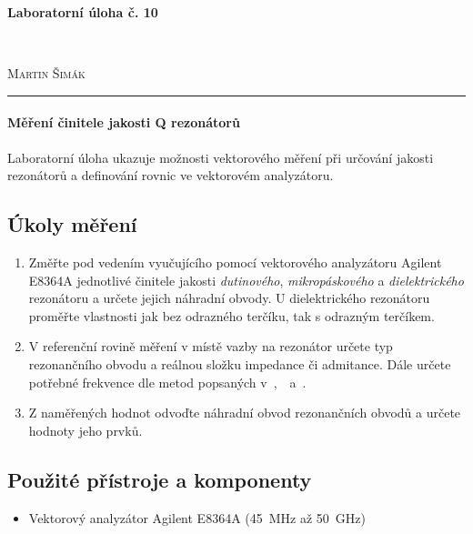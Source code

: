 \documentclass[11pt,a4paper]{article}
\begin{document}

\begin{center}
    {\LARGE\textbf{Laboratorní úloha č. 10}}\\[3mm]
    \begin{minipage}{0.4\textwidth}
        \begin{flushleft}
            \textsc{}
        \end{flushleft}
    \end{minipage}
    ~
    \begin{minipage}{0.4\textwidth}
        \begin{flushright}
            \textsc{Martin Šimák}
        \end{flushright}
    \end{minipage}
    \noindent\rule{14.5cm}{0.4pt}
\end{center}

\paragraph*{Měření činitele jakosti Q rezonátorů} Laboratorní úloha ukazuje možnosti vektorového měření při určování jakosti rezonátorů a definování rovnic ve vektorovém analyzátoru.

\subsection*{Úkoly měření}
\begin{enumerate}
    \item Změřte pod vedením vyučujícího pomocí vektorového analyzátoru Agilent E8364A jednotlivé činitele jakosti \emph{dutinového}, \emph{mikropáskového} a \emph{dielektrického} rezonátoru a určete jejich náhradní obvody. U dielektrického rezonátoru proměřte vlastnosti jak bez odrazného terčíku, tak s odrazným terčíkem.
    \item V referenční rovině měření v místě vazby na rezonátor určete typ rezonančního obvodu a reálnou složku impedance či admitance. Dále určete potřebné frekvence dle metod popsaných v~\cite{tysl:mereni-pri-velmi-vysokych-kmitoctech},~\cite{khanna-garault:determination-of-q}~a~\cite{khanna:q-measurement-of-coupled-microstrips}.
    \item Z naměřených hodnot odvoďte náhradní obvod rezonančních obvodů a určete hodnoty jeho prvků.
\end{enumerate}

\subsection*{Použité přístroje a komponenty}
\begin{itemize}
    \item Vektorový analyzátor Agilent E8364A (45~MHz až 50~GHz)
\end{itemize}
\end{document}
